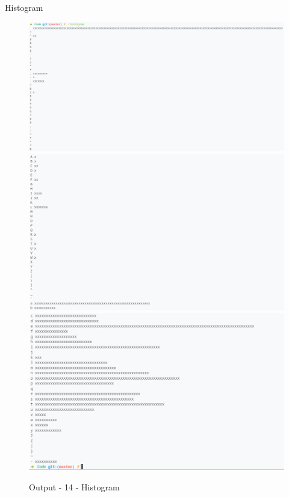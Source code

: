 Histogram
\pagebreak
\vspace*{-2.3cm}
\begin{figure}[H]
  \centering
  \includegraphics[width=6in]{Images/histogram1.png}
  \includegraphics[width=6in]{Images/histogram2.png}
  \includegraphics[width=6in]{Images/histogram3.png}
  \label{Output-14-Histogram}
  \caption{Output - 14 - Histogram}
\end{figure}
\pagebreak